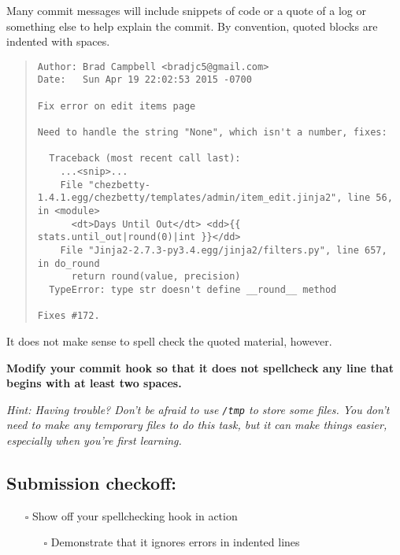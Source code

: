 \documentclass{article}
\begin{document}
\medskip
\noindent
Many commit messages will include snippets of code or a quote of a log or
something else to help explain the commit. By convention, quoted blocks are
indented with spaces.
%
\begin{quote}
\begin{Verbatim}[fontsize=\scriptsize]
Author: Brad Campbell <bradjc5@gmail.com>
Date:   Sun Apr 19 22:02:53 2015 -0700

Fix error on edit items page

Need to handle the string "None", which isn't a number, fixes:

  Traceback (most recent call last):
    ...<snip>...
    File "chezbetty-1.4.1.egg/chezbetty/templates/admin/item_edit.jinja2", line 56, in <module>
      <dt>Days Until Out</dt> <dd>{{ stats.until_out|round(0)|int }}</dd>
    File "Jinja2-2.7.3-py3.4.egg/jinja2/filters.py", line 657, in do_round
      return round(value, precision)
  TypeError: type str doesn't define __round__ method

Fixes #172.
\end{Verbatim}
\end{quote}
%
It does not make sense to spell check the quoted material, however.

\medskip
\noindent
\textbf{Modify your commit hook so that it does not spellcheck any line that
begins with at least two spaces.}

\medskip
\noindent
{\small \emph{Hint: Having trouble? Don't be afraid to use \texttt{/tmp} to
    store some files. You don't need to make any temporary files to do this
    task, but it can make things easier, especially when you're first learning.
}}

\subsection*{Submission checkoff:}
\begin{itemize}
  \item[$\square$] Show off your spellchecking hook in action
  \begin{itemize}
    \item[$\square$] Demonstrate that it ignores errors in indented lines
  \end{itemize}
\end{itemize}
\end{document}
